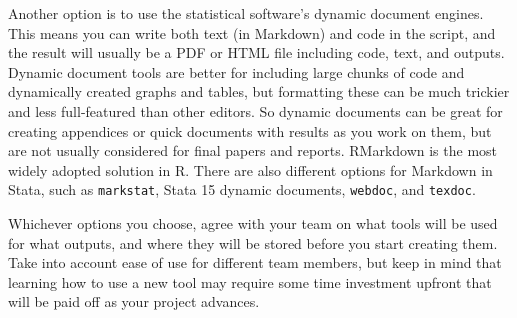 Another option is to use the statistical software's dynamic document engines.
This means you can write both text (in Markdown) and code in the script,
and the result will usually be a PDF or HTML file including code, text, and outputs.
Dynamic document tools are better for including large chunks of code and dynamically created graphs and tables,
but formatting these can be much trickier and less full-featured than other editors.
So dynamic documents can be great for creating appendices
or quick documents with results as you work on them,
but are not usually considered for final papers and reports.
RMarkdown is the most widely adopted solution in R.
There are also different options for Markdown in Stata,
such as \texttt{markstat},
Stata 15 dynamic documents,
\texttt{webdoc}, and
\texttt{texdoc}.

Whichever options you choose,
agree with your team on what tools will be used for what outputs, and
where they will be stored before you start creating them.
Take into account ease of use for different team members, but
keep in mind that learning how to use a new tool may require some
time investment upfront that will be paid off as your project advances.
